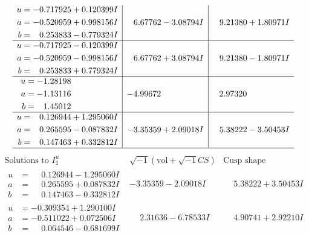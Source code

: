 \documentclass[1p]{elsarticle_modified}
\theoremstyle{definition}
\newcommand{\I}{\sqrt{-1}}
\begin{document}
$$\begin{array}{c|c|c}
\begin{aligned}
u &= -0.717925 + 0.120399 I \\
a &= -0.520959 + 0.998156 I \\
b &= \phantom{-}0.253833 - 0.779324 I\end{aligned}
 & \phantom{-}6.67762 - 3.08794 I & \phantom{-}9.21380 + 1.80971 I \\ \hline\begin{aligned}
u &= -0.717925 - 0.120399 I \\
a &= -0.520959 - 0.998156 I \\
b &= \phantom{-}0.253833 + 0.779324 I\end{aligned}
 & \phantom{-}6.67762 + 3.08794 I & \phantom{-}9.21380 - 1.80971 I \\ \hline\begin{aligned}
u &= -1.28198\phantom{ +0.000000I} \\
a &= -1.13116\phantom{ +0.000000I} \\
b &= \phantom{-}1.45012\phantom{ +0.000000I}\end{aligned}
 & -4.99672\phantom{ +0.000000I} & \phantom{-}2.97320\phantom{ +0.000000I} \\ \hline\begin{aligned}
u &= \phantom{-}0.126944 + 1.295060 I \\
a &= \phantom{-}0.265595 - 0.087832 I \\
b &= \phantom{-}0.147463 + 0.332812 I\end{aligned}
 & -3.35359 + 2.09018 I & \phantom{-}5.38222 - 3.50453 I\\
 \hline 
 \end{array}$$\newpage$$\begin{array}{c|c|c}  
\text{Solutions to }I^u_{1}& \I (\text{vol} + \sqrt{-1}CS) & \text{Cusp shape}\\
 \hline 
\begin{aligned}
u &= \phantom{-}0.126944 - 1.295060 I \\
a &= \phantom{-}0.265595 + 0.087832 I \\
b &= \phantom{-}0.147463 - 0.332812 I\end{aligned}
 & -3.35359 - 2.09018 I & \phantom{-}5.38222 + 3.50453 I \\ \hline\begin{aligned}
u &= -0.309354 + 1.290100 I \\
a &= -0.511022 + 0.072506 I \\
b &= \phantom{-}0.064546 - 0.681699 I\end{aligned}
 & \phantom{-}2.31636 - 6.78533 I & \phantom{-}4.90741 + 2.92210 I \\ \hline\begin{aligned}

\end{aligned}
\end{array}$$
\end{document}
